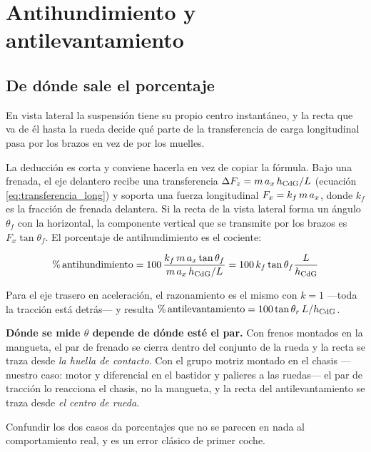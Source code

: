 \section{Antihundimiento y antilevantamiento}
\label{sec:cinematica_suspension:04}

\subsection{De dónde sale el porcentaje}

En vista lateral la suspensión tiene su propio centro instantáneo, y la recta
que va de él hasta la rueda decide qué parte de la transferencia de carga
longitudinal pasa por los brazos en vez de por los muelles.

La deducción es corta y conviene hacerla en vez de copiar la fórmula. Bajo una
frenada, el eje delantero recibe una transferencia
$\Delta F_z = m\,a_x\,h_{\mathrm{CdG}}/L$ (ecuación \eqref{eq:transferencia_long}) y
soporta una fuerza longitudinal $F_x = k_{f}\,m\,a_x$, donde $k_f$ es la
fracción de frenada delantera. Si la recta de la vista lateral forma un ángulo
$\theta_f$ con la horizontal, la componente vertical que se transmite por los
brazos es $F_x \tan\theta_f$. El porcentaje de antihundimiento es el cociente:

\begin{equation}
  \%\,\text{antihundimiento} = 100\,
     \frac{k_f\,m\,a_x \tan\theta_f}{m\,a_x\,h_{\mathrm{CdG}}/L}
   = 100\,k_f \tan\theta_f \frac{L}{h_{\mathrm{CdG}}}
  \label{eq:antidive}
\end{equation}

Para el eje trasero en aceleración, el razonamiento es el mismo con
$k = 1$ ---toda la tracción está detrás--- y resulta
$\%\,\text{antilevantamiento} = 100 \tan\theta_r \,L/h_{\mathrm{CdG}}$.

\begin{ojo}
\textbf{Dónde se mide $\theta$ depende de dónde esté el par.} Con frenos
montados en la mangueta, el par de frenado se cierra dentro del conjunto de la
rueda y la recta se traza desde \emph{la huella de contacto}. Con el grupo
motriz montado en el chasis ---nuestro caso: motor y diferencial en el bastidor
y palieres a las ruedas--- el par de tracción lo reacciona el chasis, no la
mangueta, y la recta del antilevantamiento se traza desde \emph{el centro de
rueda}.

Confundir los dos casos da porcentajes que no se parecen en nada al
comportamiento real, y es un error clásico de primer coche.
\end{ojo}

